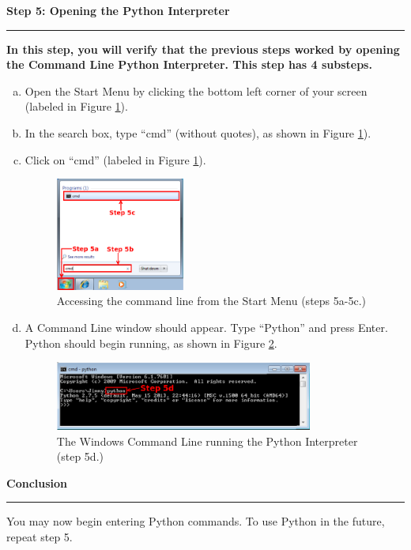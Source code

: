 \documentclass[11pt,english]{article}
\newcommand{\myhrule}{\vspace{0.3cm}\hrule\vspace{0.3cm}}
\begin{document}
\newpage
{\Large {\bf Step 5: Opening the Python Interpreter}}
\myhrule
{\bf In this step, you will verify that the previous steps worked by opening
the Command Line Python Interpreter. This step has 4 substeps.}\\

\begin{enumerate}[a.]
\item Open the Start Menu by clicking the bottom left corner of your screen
(labeled in Figure \ref{fig:dia9}).
\item In the search box, type ``cmd'' (without quotes), as shown in Figure
\ref{fig:dia9}).
\item Click on ``cmd'' (labeled in Figure \ref{fig:dia9}).
\begin{figure}[h]
\begin{center}
\includegraphics[width=0.4\textwidth]{dia9}
\end{center}
\vspace{-0.5cm}
\caption{Accessing the command line from the Start Menu (steps 5a-5c.)}
\label{fig:dia9}
\end{figure}
\item A Command Line window should appear. Type ``Python'' and press Enter.
Python should begin running, as shown in Figure \ref{fig:dia10}.
\begin{figure}[h]
\begin{center}
\includegraphics[width=0.8\textwidth]{dia10}
\end{center}
\vspace{-0.5cm}
\caption{The Windows Command Line running the Python Interpreter (step 5d.)}
\label{fig:dia10}
\end{figure}
\end{enumerate}
{\Large {\bf Conclusion}}
\myhrule
You may now begin entering Python commands. To use Python in the future, repeat
step 5.
\end{document}
